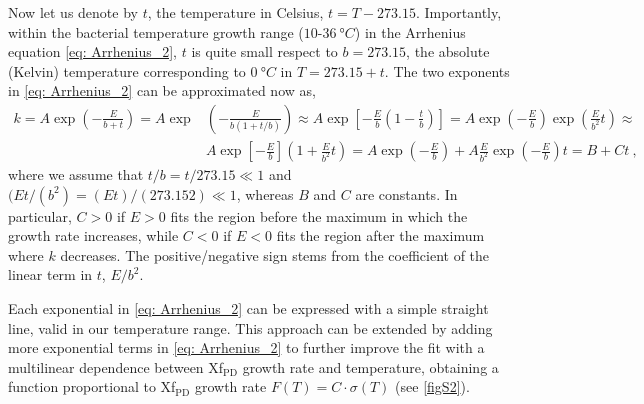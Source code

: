 Now let us denote by $t$, the temperature in Celsius, $t= T-273.15$.
Importantly, within the bacterial temperature growth range
($10$-$\SI{36}{\degree C}$) in the Arrhenius equation \cref{eq: Arrhenius_2},
$t$ is quite small respect to $b = 273.15$, the absolute (Kelvin) temperature
corresponding to $\SI{0}{\degree C}$ in $T = 273.15 + t$. The two exponents in
\cref{eq: Arrhenius_2} can be approximated now as,
\begin{equation}
    \begin{aligned}
        k=A \exp \left(-\frac{E}{b+t}\right)=A \exp & \left(-\frac{E}{b(1+t /
                b)}\right) \approx A \exp
        \left[-\frac{E}{b}\left(1-\frac{t}{b}\right)\right]=A
        \exp \left(-\frac{E}{b}\right) \exp \left(\frac{E}{b^{2}} t\right)
        \approx
        \\
                                                    & A \exp
        \left[-\frac{E}{b}\right]\left(1+\frac{E}{b^{2}} t\right)=A
        \exp \left(-\frac{E}{b}\right)+A \frac{E}{b^{2}} \exp
        \left(-\frac{E}{b}\right)
        t=B+C t \ ,
    \end{aligned}
    \label{eq:tempapprox}
\end{equation}
where we assume that $t/b = t/273.15 \ll1$ and	$(Et/(b^2) = (Et)/(273.152)
    \ll1$, whereas $B$ and $C$ are constants. In particular, $C>0$ if $E>0$
fits
the region before the maximum in which the growth rate increases, while $C<0$
if $E<0$ fits the region after the maximum where $k$ decreases. The
positive/negative sign stems from the coefficient of the linear term in $t$,
$E/b^2$.

Each exponential in \cref{eq: Arrhenius_2} can be expressed with a simple
straight line, valid in our temperature range. This approach can be extended by
adding more exponential terms in \cref{eq: Arrhenius_2} to further improve the
fit with a multilinear dependence between Xf$_{\textrm{PD}}$ growth rate and
temperature, obtaining a function proportional to Xf$_{\textrm{PD}}$ growth
rate $F(T)=C\cdot\sigma(T)$ (see \cref{figS2}).

